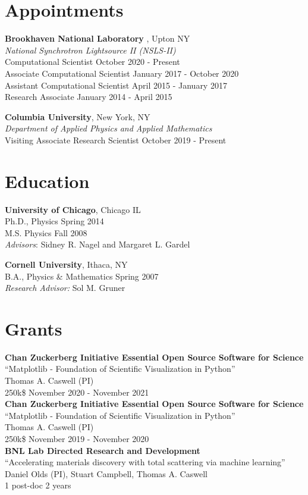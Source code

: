 \documentclass[margin]{res} %
\begin{document}
\begin{resume}
\section{Appointments}

{\bf Brookhaven National Laboratory }, Upton NY \hfill\\
{\it National Synchrotron Lightsource II (NSLS-II)} \\
Computational Scientist \hfill October 2020 - Present\\
Associate Computational Scientist \hfill January 2017 - October 2020\\
Assistant Computational Scientist \hfill April 2015 - January 2017\\
Research Associate \hfill January 2014 - April 2015

{\bf Columbia University}, New York, NY \hfill\\
{\it Department of Applied Physics and Applied Mathematics}\\
Visiting Associate Research Scientist \hfill October 2019 - Present

\section{Education}

{\bf University of Chicago}, Chicago IL \\
Ph.D., Physics \hfill Spring 2014\\
M.S. Physics \hfill Fall 2008 \\
{\itshape Advisors}: Sidney R. Nagel and Margaret L. Gardel

{\bf Cornell University}, Ithaca, NY \\
B.A., Physics \& Mathematics \hfill Spring 2007\\
{\itshape Research Advisor:}  Sol M. Gruner

\section{Grants}
{\bf Chan Zuckerberg Initiative Essential Open Source Software for Science} \hfill \\
``Matplotlib - Foundation of Scientific Visualization in Python''\\
Thomas A. Caswell (PI) \\
250k\$ \hfill November 2020 - November 2021\\
{\bf Chan Zuckerberg Initiative Essential Open Source Software for Science} \hfill \\
``Matplotlib - Foundation of Scientific Visualization in Python''\\
Thomas A. Caswell (PI) \\
250k\$ \hfill November 2019 - November 2020\\
{\bf BNL Lab Directed Research and Development}\\
``Accelerating materials discovery with total scattering via machine learning''\\
Daniel Olds (PI), Stuart Campbell, Thomas A. Caswell \\
1 post-doc \hfill 2 years




\end{resume}
\end{document}
